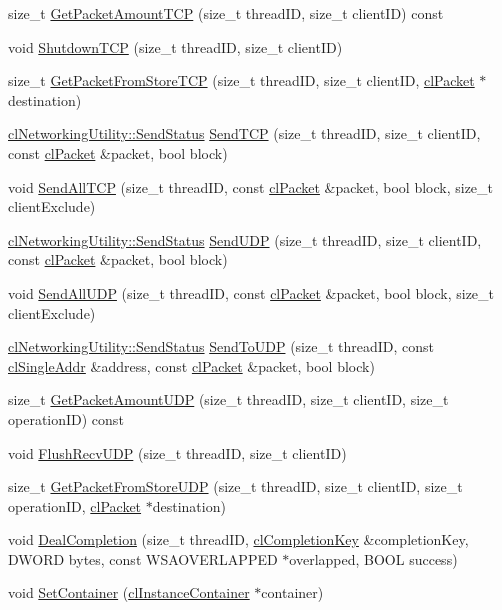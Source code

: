 \begin{DoxyCompactItemize}
\item 
size\_\-t \hyperlink{classcl_server_state_a6293150ae0d2deee1e853e8de2fc6549}{GetPacketAmountTCP} (size\_\-t threadID, size\_\-t clientID) const 
\item 
void \hyperlink{classcl_server_state_ab6bb7ca048e12e276cfa85798bbca305}{ShutdownTCP} (size\_\-t threadID, size\_\-t clientID)
\item 
size\_\-t \hyperlink{classcl_server_state_a434b7015edbb25a83593e60f7ee6f0f7}{GetPacketFromStoreTCP} (size\_\-t threadID, size\_\-t clientID, \hyperlink{classcl_packet}{clPacket} $\ast$destination)
\item 
\hyperlink{classcl_networking_utility_a19389cda12603396e03caa9d82073803}{clNetworkingUtility::SendStatus} \hyperlink{classcl_server_state_aa26a11694b770b75c58e3a5931fd387e}{SendTCP} (size\_\-t threadID, size\_\-t clientID, const \hyperlink{classcl_packet}{clPacket} \&packet, bool block)
\item 
void \hyperlink{classcl_server_state_ab3abf9a84501271ce55c2b1eda4d5fa3}{SendAllTCP} (size\_\-t threadID, const \hyperlink{classcl_packet}{clPacket} \&packet, bool block, size\_\-t clientExclude)
\item 
\hyperlink{classcl_networking_utility_a19389cda12603396e03caa9d82073803}{clNetworkingUtility::SendStatus} \hyperlink{classcl_server_state_a4c582a5907e427eb0091079bd4ada3b0}{SendUDP} (size\_\-t threadID, size\_\-t clientID, const \hyperlink{classcl_packet}{clPacket} \&packet, bool block)
\item 
void \hyperlink{classcl_server_state_a53e069f3cc1bc74202704ffb75e398f1}{SendAllUDP} (size\_\-t threadID, const \hyperlink{classcl_packet}{clPacket} \&packet, bool block, size\_\-t clientExclude)
\item 
\hyperlink{classcl_networking_utility_a19389cda12603396e03caa9d82073803}{clNetworkingUtility::SendStatus} \hyperlink{classcl_server_state_ac2f8e109ed5f86a2feaebc04d2379b45}{SendToUDP} (size\_\-t threadID, const \hyperlink{classcl_single_addr}{clSingleAddr} \&address, const \hyperlink{classcl_packet}{clPacket} \&packet, bool block)
\item 
size\_\-t \hyperlink{classcl_server_state_ac5219f6dfbf0a4fc46c2f0b10f4777a4}{GetPacketAmountUDP} (size\_\-t threadID, size\_\-t clientID, size\_\-t operationID) const 
\item 
void \hyperlink{classcl_server_state_a3e804dd8e1d0fb5ce0307f461d5a1e5e}{FlushRecvUDP} (size\_\-t threadID, size\_\-t clientID)
\item 
size\_\-t \hyperlink{classcl_server_state_acd70ba0bd1cf45ddc0f30cda86a1fbc5}{GetPacketFromStoreUDP} (size\_\-t threadID, size\_\-t clientID, size\_\-t operationID, \hyperlink{classcl_packet}{clPacket} $\ast$destination)
\item 
void \hyperlink{classcl_server_state_a8d2ff8fdba2c01906239b7f513140fd7}{DealCompletion} (size\_\-t threadID, \hyperlink{classcl_completion_key}{clCompletionKey} \&completionKey, DWORD bytes, const WSAOVERLAPPED $\ast$overlapped, BOOL success)
\item 
void \hyperlink{classcl_server_state_ae2bc69bbd2bff4071cb148da272bfe95}{SetContainer} (\hyperlink{classcl_instance_container}{clInstanceContainer} $\ast$container)
\end{DoxyCompactItemize}
